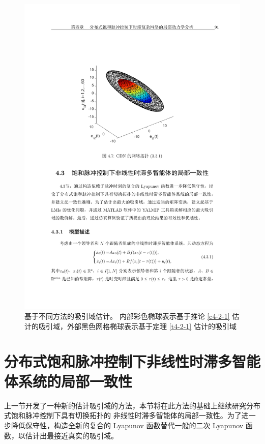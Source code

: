 \begin{figure}[H]
\begin{center}
        \begin{minipage}[c]{0.5\textwidth} \centering\includegraphics[scale=0.7]{./ch4/fig4-7.pdf} \vspace{0.5cm}
            \caption{基于不同方法的吸引域估计。 内部彩色椭球表示基于推论 \ref{c4-2-1} 估计的吸引域，外部黑色网格椭球表示基于定理 \ref{t4-2-1} 估计的吸引域}
            \label{f4-7}
        \end{minipage}
    \end{center}
\end{figure}
\section{分布式饱和脉冲控制下非线性时滞多智能体系统的局部一致性}
上一节开发了一种新的估计吸引域的方法，本节将在此方法的基础上继续研究分布式饱和脉冲控制下具有切换拓扑的 非线性时滞多智能体的局部一致性。为了进一步降低保守性，构造全新的复合的 Lyapunov 函数替代一般的二次 Lyapunov 函数，以估计出最接近真实的吸引域。
